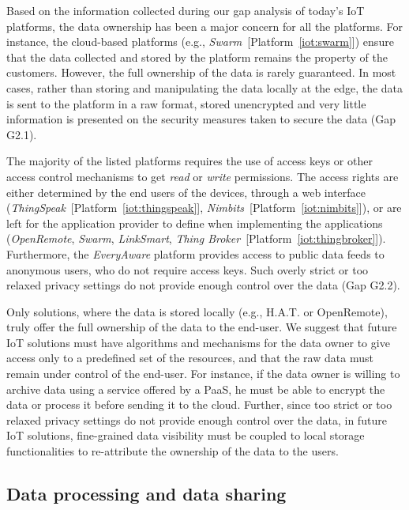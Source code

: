 \documentclass[preprint,10pt,5p]{elsarticle}
\newcommand{\citeiot}[1]{[Platform~\ref{#1}]}
\begin{document}
Based on the information collected during our gap analysis of today's
IoT platforms, the data ownership has been a major concern for all the
platforms. 
For instance, the cloud-based platforms (e.g.,
\emph{Swarm}~\citeiot{iot:swarm}) ensure that the data collected and
stored by the platform remains the property of the customers. 
However, the full ownership of the data is rarely guaranteed.
In most cases, rather than storing and manipulating the 
data locally at the edge, the data is sent to the platform in a raw format, stored
unencrypted and very little information is presented on the security measures
taken to secure the data (Gap G2.1).

The majority of the listed platforms requires the use of access keys
or other access control mechanisms to get \emph{read} or \emph{write}
permissions.
The access rights are either determined by
the end users of the devices, through a web interface
(\emph{ThingSpeak}~\citeiot{iot:thingspeak},
\emph{Nimbits}~\citeiot{iot:nimbits}), or are left for the application
provider to define when implementing the applications
(\emph{OpenRemote}, \emph{Swarm},
\emph{LinkSmart\textsuperscript{\texttrademark}}, 
\emph{Thing Broker}~\citeiot{iot:thingbroker}). 
Furthermore, the \emph{EveryAware} platform provides access 
to public data feeds to anonymous users, who do not require access keys.
Such overly strict or too relaxed privacy settings do not provide enough 
control over the data (Gap G2.2).

Only solutions, where the data is stored locally (e.g., H.A.T. or OpenRemote), 
truly offer the full ownership of the data to the end-user. 
We suggest that future IoT solutions must have algorithms and mechanisms
for the data owner to give access only to a predefined set of the resources, 
and that the raw data must remain under control of the end-user. 
For instance, if the data owner is willing to archive data using a service
offered by a PaaS, he must be able to encrypt the data or process it before
sending it to the cloud.  
Further, since too strict or too relaxed privacy settings do not provide enough 
control over the data, in future IoT solutions, fine-grained data visibility must 
be coupled to local storage functionalities to re-attribute the ownership of 
the data to the users. 

\subsection{Data processing and data sharing}\label{sec:gap_sharing}
\end{document}
